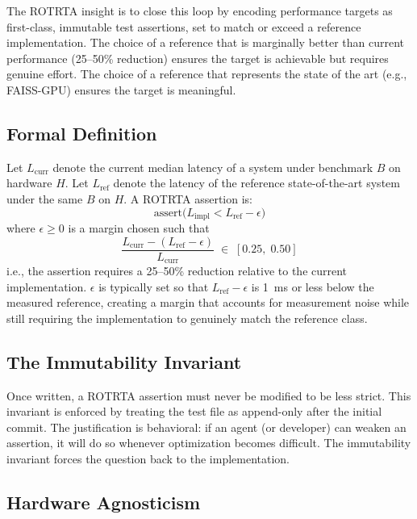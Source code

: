 \documentclass[conference]{IEEEtran}
\begin{document}
The ROTRTA insight is to close this loop by encoding performance targets as
first-class, immutable test assertions, set to match or exceed a reference
implementation.  The choice of a reference that is marginally better than
current performance (25--50\% reduction) ensures the target is achievable
but requires genuine effort.  The choice of a reference that represents the
state of the art (e.g., FAISS-GPU) ensures the target is meaningful.

\subsection{Formal Definition}

Let $L_\text{curr}$ denote the current median latency of a system under
benchmark $B$ on hardware $H$.  Let $L_\text{ref}$ denote the latency of
the reference state-of-the-art system under the same $B$ on $H$.  A ROTRTA
assertion is:
\begin{equation}
  \text{assert}\bigl(L_\text{impl} < L_\text{ref} - \epsilon\bigr)
  \label{eq:rotrta}
\end{equation}
where $\epsilon \geq 0$ is a margin chosen such that
\begin{equation}
  \frac{L_\text{curr} - (L_\text{ref} - \epsilon)}{L_\text{curr}}
  \;\in\; [0.25,\; 0.50]
  \label{eq:budget}
\end{equation}
i.e., the assertion requires a 25--50\% reduction relative to the current
implementation.  $\epsilon$ is typically set so that $L_\text{ref} - \epsilon$
is \SI{1}{\ms} or less below the measured reference, creating a margin that
accounts for measurement noise while still requiring the implementation to
genuinely match the reference class.

\subsection{The Immutability Invariant}

Once written, a ROTRTA assertion must never be modified to be less strict.
This invariant is enforced by treating the test file as append-only after the
initial commit.  The justification is behavioral: if an agent (or developer)
can weaken an assertion, it will do so whenever optimization becomes difficult.
The immutability invariant forces the question back to the implementation.

\subsection{Hardware Agnosticism}
\end{document}
